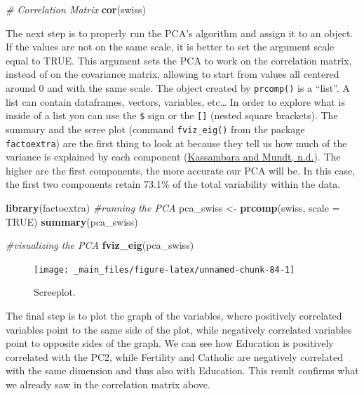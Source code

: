 \documentclass[
]{svmono}
\newenvironment{Shaded}{\begin{snugshade}}{\end{snugshade}}
\newcommand{\AttributeTok}[1]{\textcolor[rgb]{0.13,0.29,0.53}{#1}}
\newcommand{\CommentTok}[1]{\textcolor[rgb]{0.56,0.35,0.01}{\textit{#1}}}
\newcommand{\ConstantTok}[1]{\textcolor[rgb]{0.56,0.35,0.01}{#1}}
\newcommand{\FunctionTok}[1]{\textcolor[rgb]{0.13,0.29,0.53}{\textbf{#1}}}
\newcommand{\NormalTok}[1]{#1}
\newcommand{\OtherTok}[1]{\textcolor[rgb]{0.56,0.35,0.01}{#1}}
\begin{document}
\begin{Shaded}
\begin{Highlighting}[]
\CommentTok{\# Correlation Matrix}
\FunctionTok{cor}\NormalTok{(swiss)}
\end{Highlighting}
\end{Shaded}

The next step is to properly run the PCA's algorithm and assign it to an
object. If the values are not on the same scale, it is better to set the
argument scale equal to TRUE. This argument sets the PCA to work on the
correlation matrix, instead of on the covariance matrix, allowing to
start from values all centered around 0 and with the same scale. The
object created by \texttt{prcomp()} is a ``list''. A list can contain dataframes,
vectors, variables, etc\ldots{} In order to explore what is inside of a list
you can use the \texttt{\$} sign or the \texttt{{[}{]}} (nested square brackets). The
summary and the scree plot (command \texttt{fviz\_eig()} from the package
\texttt{factoextra}) are the first thing to look at because they tell us how
much of the variance is explained by each component (\protect\hyperlink{ref-kassambara}{Kassambara and Mundt, n.d.}). The
higher are the first components, the more accurate our PCA will be. In
this case, the first two components retain 73.1\% of the total
variability within the data.

\begin{Shaded}
\begin{Highlighting}[]
\FunctionTok{library}\NormalTok{(factoextra)}
\CommentTok{\#running the PCA}
\NormalTok{pca\_swiss }\OtherTok{\textless{}{-}} \FunctionTok{prcomp}\NormalTok{(swiss, }\AttributeTok{scale =} \ConstantTok{TRUE}\NormalTok{)}
\FunctionTok{summary}\NormalTok{(pca\_swiss)}

\CommentTok{\#visualizing the PCA}
\FunctionTok{fviz\_eig}\NormalTok{(pca\_swiss)}
\end{Highlighting}
\end{Shaded}

\begin{figure}[H]

{\centering \texttt{[image: \_main\_files/figure-latex/unnamed-chunk-84-1]} 

}

\caption{Screeplot.}\label{fig:unnamed-chunk-84}
\end{figure}

The final step is to plot the graph of the variables, where positively
correlated variables point to the same side of the plot, while
negatively correlated variables point to opposite sides of the graph. We
can see how Education is positively correlated with the PC2, while
Fertility and Catholic are negatively correlated with the same dimension
and thus also with Education. This result confirms what we already saw
in the correlation matrix above.
\end{document}
